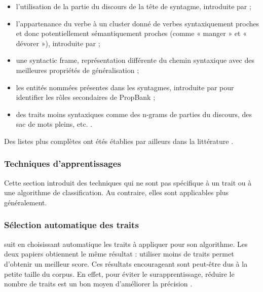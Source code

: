 \begin{itemize}

    \item l'utilisation de la partie du discours de la tête de syntagme,
        introduite par \cite{surdeanu2003using} ;

    \item l'appartenance du verbe à un cluster donné de verbes syntaxiquement
        proches et donc potentiellement sémantiquement proches (comme « manger
        » et « dévorer »), introduite par \cite{pradhan2004shallow} ;

    \item une {syntactic frame}, représentation différente du chemin syntaxique
        avec des meilleures propriétés de généralisation
        \citep{xue2004calibrating} ;

    \item les entités nommées présentes dans les syntagmes, introduite par
        \cite{pradhan2005semantic} pour identifier les rôles secondaires de
        PropBank ;

    \item des traits moins syntaxiques comme des n-grams de parties du
        discours, des sac de mots pleins, etc. \citep{surdeanu2007combination}.

\end{itemize}

Des listes plus complètes ont étés établies par ailleurs dans la littérature
\citep{pradhan2005semantic,marquez2008semantic,palmer2010semantic}.

\subsubsection{Techniques d'apprentissages}

Cette section introduit des techniques qui ne sont pas spécifique à un trait ou
à une algorithme de classification. Au contraire, elles sont applicables plus
généralement.

\subsubsection{Sélection automatique des traits}

\cite{dinu2007sometimes} suit \cite{mihalcea2002instance} en choisissant
automatique les traits à appliquer pour son algorithme. Les deux papiers
obtiennent le même résultat : utiliser moins de traits permet d'obtenir un
meilleur score. Ces résultats encourageant sont peut-être dus à la petite
taille du corpus. En effet, pour éviter le surapprentissage, réduire le nombre
de traits est un bon moyen d'améliorer la précision \citep{van2004bias}.

